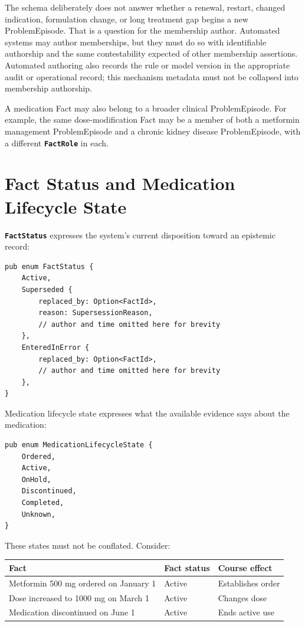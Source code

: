 \documentclass[11pt]{article}
\newcommand{\entity}[1]{\texttt{\textbf{#1}}}
\begin{document}
The schema deliberately does not answer whether a renewal, restart, changed
indication, formulation change, or long treatment gap begins a new
ProblemEpisode. That is a question for the membership author. Automated
systems may author memberships, but they must do so with identifiable
authorship and the same contestability expected of other membership
assertions. Automated authoring also records the rule or model version in the
appropriate audit or operational record; this mechanism metadata must not be
collapsed into membership authorship.

A medication Fact may also belong to a broader clinical ProblemEpisode. For
example, the same dose-modification Fact may be a member of both a metformin
management ProblemEpisode and a chronic kidney disease ProblemEpisode, with a
different \entity{FactRole} in each.

\section{Fact Status and Medication Lifecycle State}
\label{sec:status-distinction}

\entity{FactStatus} expresses the system's current disposition toward an
epistemic record:

\begin{lstlisting}
pub enum FactStatus {
    Active,
    Superseded {
        replaced_by: Option<FactId>,
        reason: SupersessionReason,
        // author and time omitted here for brevity
    },
    EnteredInError {
        replaced_by: Option<FactId>,
        // author and time omitted here for brevity
    },
}
\end{lstlisting}

Medication lifecycle state expresses what the available evidence says about
the medication:

\begin{lstlisting}
pub enum MedicationLifecycleState {
    Ordered,
    Active,
    OnHold,
    Discontinued,
    Completed,
    Unknown,
}
\end{lstlisting}

These states must not be conflated. Consider:

\begin{center}
\renewcommand{\arraystretch}{1.25}
\begin{tabular}{p{6.4cm} p{3.2cm} p{3.2cm}}
\toprule
\textbf{Fact} & \textbf{Fact status} & \textbf{Course effect} \\
\midrule
Metformin 500 mg ordered on January 1 & Active & Establishes order \\
Dose increased to 1000 mg on March 1 & Active & Changes dose \\
Medication discontinued on June 1 & Active & Ends active use \\
\bottomrule
\end{tabular}
\end{center}
\end{document}
